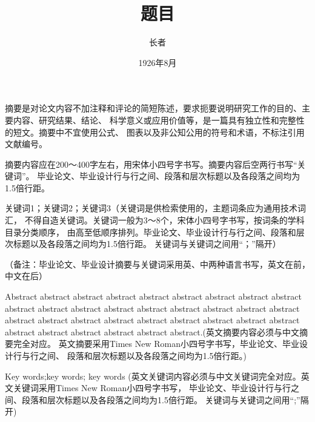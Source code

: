 \documentclass{sicnuthesis}
\title{题目}
\author{长者}
\date{1926年8月}
\begin{document}
\frontmatter %

\maketitle

\newpage

\begin{abstractch}
    摘要是对论文内容不加注释和评论的简短陈述，要求扼要说明研究工作的目的、主要内容、研究结果、结论、
    科学意义或应用价值等，是一篇具有独立性和完整性的短文。摘要中不宜使用公式、
    图表以及非公知公用的符号和术语，不标注引用文献编号。

    摘要内容应在200～400字左右，用宋体小四号字书写。摘要内容后空两行书写“关键词”。
    毕业论文、毕业设计行与行之间、段落和层次标题以及各段落之间均为1.5倍行距。
\end{abstractch}

\vspace{1cm}

\begin{keywordsch}
    关键词1；关键词2；关键词3（关键词是供检索使用的，主题词条应为通用技术词汇，
    不得自造关键词。关键词一般为3～8个，宋体小四号字书写，按词条的学科目录分类顺序，
    由高至低顺序排列。毕业论文、毕业设计行与行之间、段落和层次标题以及各段落之间均为1.5倍行距。
    关键词与关键词之间用“；”隔开）

    （备注：毕业论文、毕业设计摘要与关键词采用英、中两种语言书写，英文在前，中文在后）
\end{keywordsch}

\newpage

\begin{abstracten}
    Abstract abstract abstract abstract abstract abstract abstract abstract abstract abstract 
    abstract abstract abstract abstract abstract abstract abstract abstract abstract abstract 
    abstract abstract abstract abstract abstract abstract abstract abstract abstract abstract 
    abstract abstract abstract.(英文摘要内容必须与中文摘要完全对应。
    英文摘要采用Times New Roman小四号字书写，毕业论文、毕业设计行与行之间、
    段落和层次标题以及各段落之间均为1.5倍行距。)
\end{abstracten}

\vspace{1cm}

\begin{keywordsen}
    Key words;key words; key words
    (英文关键词内容必须与中文关键词完全对应。英文关键词采用Times New Roman小四号字书写，
    毕业论文、毕业设计行与行之间、段落和层次标题以及各段落之间均为1.5倍行距。
    关键词与关键词之间用“;”隔开)
\end{keywordsen}
\end{document}
